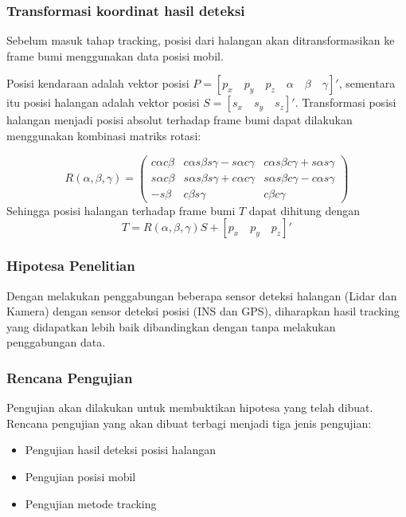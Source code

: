 \begin{frame}
    \frametitle{Transformasi koordinat hasil deteksi}
    \justifying
    Sebelum masuk tahap tracking, posisi dari halangan akan ditransformasikan ke frame bumi menggunakan data posisi mobil. 
    
    Posisi kendaraan adalah vektor posisi $P = [p_x \quad p_y \quad p_z \quad \alpha \quad \beta \quad \gamma]'$, sementara itu posisi halangan adalah vektor posisi $S = [s_x \quad s_y \quad s_z]'$. Transformasi posisi halangan menjadi posisi absolut terhadap frame bumi dapat dilakukan menggunakan kombinasi matriks rotasi:

    \begin{equation}
        R(\alpha, \beta, \gamma)=
        \left(\begin{array}{ccc}
        c \alpha c \beta & c \alpha s \beta s \gamma-s \alpha c \gamma & c \alpha s \beta c \gamma+s \alpha s \gamma \\
        s \alpha c \beta & s \alpha s \beta s \gamma+c \alpha c \gamma & s \alpha s \beta c \gamma-c \alpha s \gamma \\
        -s \beta & c \beta s \gamma & c \beta c \gamma
        \end{array}\right)
    \end{equation}
    Sehingga posisi halangan terhadap frame bumi $T$ dapat dihitung dengan
    \begin{equation}
        T = R(\alpha, \beta, \gamma)S + [p_x \quad p_y \quad p_z]'
    \end{equation}
\end{frame}


\begin{frame}
    \frametitle{Hipotesa Penelitian}
    \justifying
    Dengan melakukan penggabungan beberapa sensor deteksi halangan (Lidar dan Kamera) dengan sensor deteksi posisi (INS dan GPS), diharapkan hasil tracking yang didapatkan lebih baik dibandingkan dengan tanpa melakukan penggabungan data.
\end{frame}


\begin{frame}
    \frametitle{Rencana Pengujian}
    \justifying
    Pengujian akan dilakukan untuk membuktikan hipotesa yang telah dibuat. Rencana pengujian yang akan dibuat terbagi menjadi tiga jenis pengujian:
    \begin{itemize}
        \item Pengujian hasil deteksi posisi halangan
        \item Pengujian posisi mobil
        \item Pengujian metode tracking
    \end{itemize}
\end{frame}


